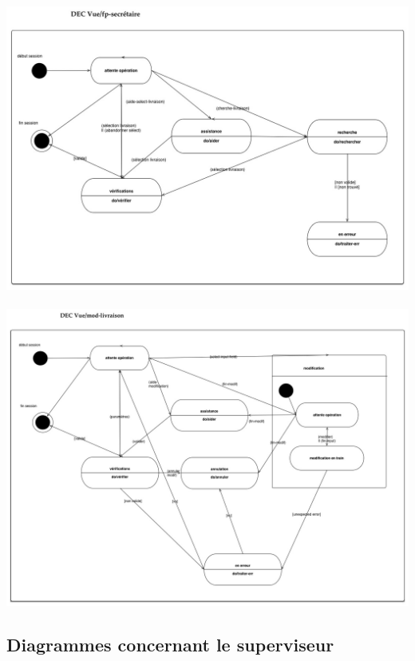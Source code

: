 \documentclass{report}
\begin{document}
~~\\
~~\\
\includegraphics[scale = 0.5, angle = 90]{images/dec-secretaire-principale.jpg}

\paragraph{}

\includegraphics[scale = 0.5, angle = 90]{images/dec-secretaire-modif.jpg}


\subsection{Diagrammes concernant le superviseur}
\end{document}
